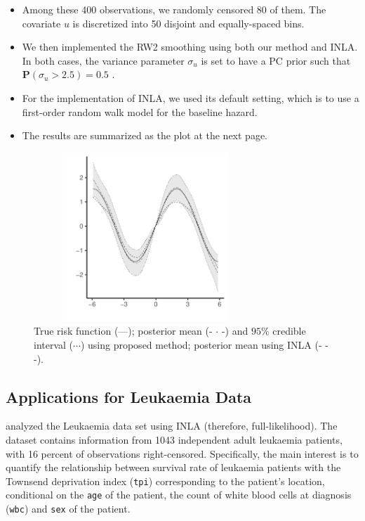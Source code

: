 \documentclass{beamer} %
\begin{document}
\begin{frame}
\begin{itemize}
\item Among these 400 observations, we randomly censored 80 of them. The covariate $u$ is discretized into 50 disjoint and equally-spaced bins.
\pause
\item We then implemented the RW2 smoothing using both our method and INLA. In both cases, the variance parameter $\sigma_u$ is set to have a PC prior such that $\textbf{P}(\sigma_u > 2.5) = 0.5$ \citep{pcprior}.
\pause
\item For the implementation of INLA, we used its default setting, which is to use a first-order random walk model for the baseline hazard. 
\pause
\item The results are summarized as the plot at the next page.
\end{itemize}
\end{frame}

\begin{frame}
\begin{figure}
\centering
\includegraphics[width=0.75\textwidth,height=2.5in]{SmoothingSim_FinalPlot}
\caption{ True risk function (---); posterior mean (- $\cdot$ -) and $95\%$ credible interval ($\cdots$) using proposed method; posterior mean using INLA (- - -).}
\end{figure}
\end{frame}


\subsection{Applications for Leukaemia Data}
\begin{frame}
\cite{inlacoxph} analyzed the Leukaemia data set using INLA (therefore, full-likelihood). The dataset contains information from 1043 independent adult leukaemia patients, with 16 percent of observations right-censored. Specifically, the main interest is to quantify the relationship between survival rate of leukaemia patients with the Townsend deprivation index (\texttt{tpi}) corresponding to the patient's location, conditional on the \texttt{age} of the patient, the count of white blood cells at diagnosis (\texttt{wbc}) and \texttt{sex} of the patient.
\end{frame}
\end{document}
